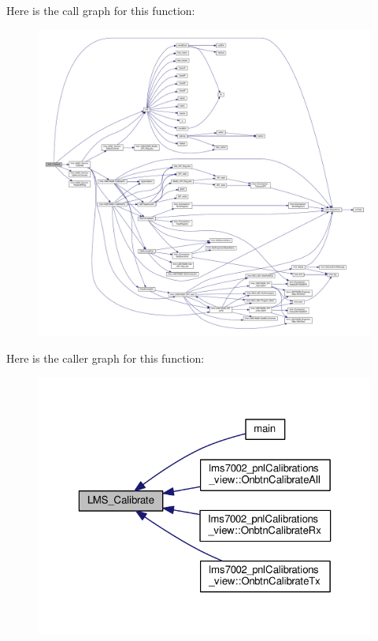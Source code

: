 Here is the call graph for this function\+:
\nopagebreak
\begin{figure}[H]
\begin{center}
\leavevmode
\includegraphics[width=350pt]{df/de1/lms7__api_8cpp_a30253e6e7221c70d726b6bb06c69e43e_cgraph}
\end{center}
\end{figure}




Here is the caller graph for this function\+:
\nopagebreak
\begin{figure}[H]
\begin{center}
\leavevmode
\includegraphics[width=323pt]{df/de1/lms7__api_8cpp_a30253e6e7221c70d726b6bb06c69e43e_icgraph}
\end{center}
\end{figure}


